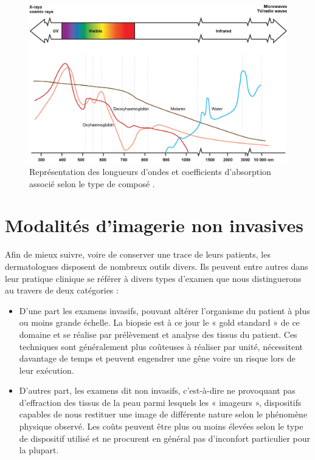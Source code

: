 \begin{figure}[H]
    \centering
    \includegraphics[width=\linewidth]{contents/chapter_2/resources/light_absorption.png}
    \caption{Représentation des longueurs d'ondes et coefficients d'absorption associé selon le type de composé \cite{Stewart2013}.}
    \label{fig:light_absorption}
\end{figure}
 
\clearpage
\section{Modalités d’imagerie non invasives}
Afin de mieux suivre, voire de conserver une trace de leurs patients, les dermatologues disposent de nombreux outils divers. Ils peuvent entre autres dans leur pratique clinique se référer à divers types d’examen que nous distinguerons au travers de deux catégories :
\begin{itemize}
\item D’une part les examens invasifs, pouvant altérer l’organisme du patient à plus ou moins grande échelle. La biopsie est à ce jour le « gold standard » de ce domaine et se réalise par prélèvement et analyse des tissus du patient. Ces techniques sont généralement plus coûteuses à réaliser par unité, nécessitent davantage de temps et peuvent engendrer une gêne voire un risque lors de leur exécution.
\item D’autres part, les examens dit non invasifs, c’est-à-dire ne provoquant pas d’effraction des tissus de la peau parmi lesquels les « imageurs », dispositifs capables de nous restituer une image de différente nature selon le phénomène physique observé. Les coûts peuvent être plus ou moins élevées selon le type de dispositif utilisé et ne procurent en général pas d’inconfort particulier pour la plupart.
\end{itemize}\par

